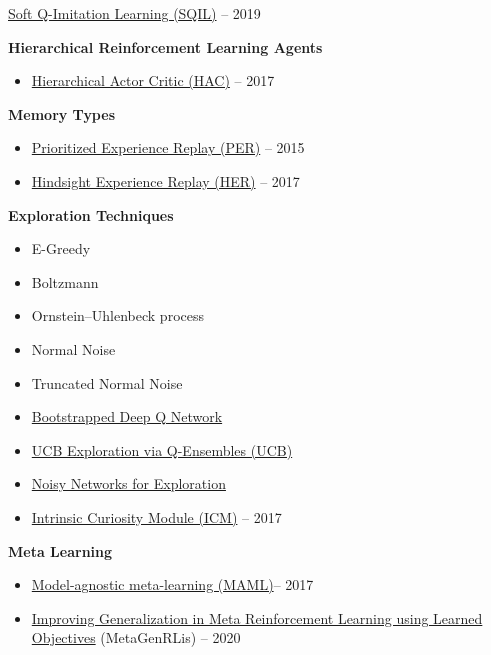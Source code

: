 \documentclass[
  a4paper,
  DIV=11,
  numbers=noendperiod]{scrreprt}
\providecommand{\tightlist}{%
  \setlength{\itemsep}{0pt}\setlength{\parskip}{0pt}}\usepackage{longtable,booktabs,array}
\begin{document}
\href{https://arxiv.org/abs/1905.11108}{Soft Q-Imitation Learning
(SQIL)} -- 2019

\textbf{Hierarchical Reinforcement Learning Agents}

\begin{itemize}
\tightlist
\item
  \href{https://arxiv.org/abs/1712.00948.pdf}{Hierarchical Actor Critic
  (HAC)} -- 2017
\end{itemize}

\textbf{Memory Types}

\begin{itemize}
\tightlist
\item
  \href{https://arxiv.org/abs/1511.05952}{Prioritized Experience Replay
  (PER)} -- 2015
\item
  \href{https://arxiv.org/abs/1707.01495.pdf}{Hindsight Experience
  Replay (HER)} -- 2017
\end{itemize}

\textbf{Exploration Techniques}

\begin{itemize}
\tightlist
\item
  E-Greedy
\item
  Boltzmann
\item
  Ornstein--Uhlenbeck process
\item
  Normal Noise
\item
  Truncated Normal Noise
\item
  \href{https://arxiv.org/abs/1602.04621}{Bootstrapped Deep Q Network}~
\item
  \href{https://arxiv.org/abs/1706.01502}{UCB Exploration via
  Q-Ensembles (UCB)}~
\item
  \href{https://arxiv.org/abs/1706.10295}{Noisy Networks for
  Exploration}~
\item
  \href{https://pathak22.github.io/noreward-rl/}{Intrinsic Curiosity
  Module (ICM)} -- 2017
\end{itemize}

\textbf{Meta Learning}

\begin{itemize}
\tightlist
\item
  \href{https://arxiv.org/abs/1703.03400}{Model-agnostic meta-learning
  (MAML)}-- 2017
\item
  \href{https://openreview.net/pdf?id=S1evHerYPr}{Improving
  Generalization in Meta Reinforcement Learning using Learned
  Objectives} (MetaGenRLis) -- 2020
\end{itemize}
\end{document}
